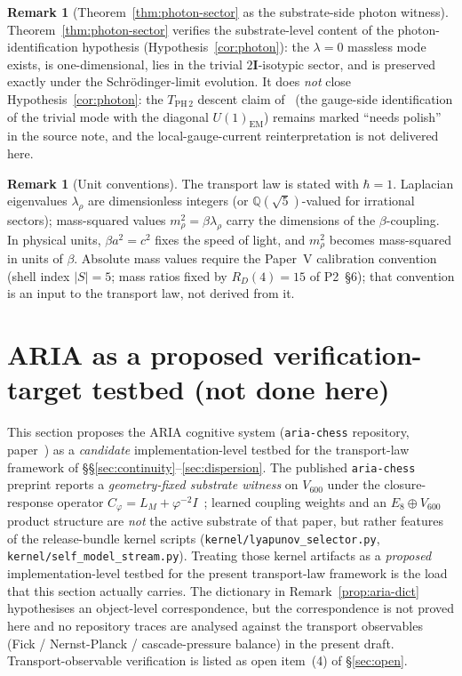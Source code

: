 \documentclass[11pt]{article}
\theoremstyle{definition}
\newtheorem{remark}[theorem]{Remark}
\newcommand{\Q}{\mathbb{Q}}
\newcommand{\twoI}{2\mathbf{I}}
\begin{document}
\begin{remark}[Theorem~\ref{thm:photon-sector} as the substrate-side photon witness]\label{rem:photon-sector-status}
Theorem~\ref{thm:photon-sector} verifies the substrate-level content of the photon-identification hypothesis (Hypothesis~\ref{cor:photon}): the $\lambda = 0$ massless mode exists, is one-dimensional, lies in the trivial $\twoI$-isotypic sector, and is preserved exactly under the Schr\"{o}dinger-limit evolution. It does \emph{not} close Hypothesis~\ref{cor:photon}: the $T_{\text{PH}\,2}$ descent claim of~\citep{CascadeAlphaChain} (the gauge-side identification of the trivial mode with the diagonal $U(1)_{\text{EM}}$) remains marked ``needs polish'' in the source note, and the local-gauge-current reinterpretation is not delivered here.
\end{remark}

\begin{remark}[Unit conventions]\label{rem:units}
The transport law is stated with $\hbar = 1$. Laplacian eigenvalues $\lambda_\rho$ are dimensionless integers (or $\Q(\sqrt 5)$-valued for irrational sectors); mass-squared values $m_\rho^2 = \beta \lambda_\rho$ carry the dimensions of the $\beta$-coupling. In physical units, $\beta a^2 = c^2$ fixes the speed of light, and $m_\rho^2$ becomes mass-squared in units of $\beta$. Absolute mass values require the Paper~V calibration convention (shell index $|S| = 5$; mass ratios fixed by $R_D(4) = 15$ of P2~\S 6); that convention is an input to the transport law, not derived from it.
\end{remark}

\section{ARIA as a proposed verification-target testbed (not done here)}\label{sec:aria}

This section proposes the ARIA cognitive system (\texttt{aria-chess} repository, paper~\citep{SmartARIAChess2026}) as a \emph{candidate} implementation-level testbed for the transport-law framework of \S\S\ref{sec:continuity}--\ref{sec:dispersion}. The published \texttt{aria-chess} preprint reports a \emph{geometry-fixed substrate witness} on $V_{600}$ under the closure-response operator $C_\varphi = L_M + \varphi^{-2}I$~\citep{SmartARIAClosureKernel2026}; learned coupling weights and an $E_8 \oplus V_{600}$ product structure are \emph{not} the active substrate of that paper, but rather features of the release-bundle kernel scripts (\texttt{kernel/lyapunov\_selector.py}, \texttt{kernel/self\_model\_stream.py}). Treating those kernel artifacts as a \emph{proposed} implementation-level testbed for the present transport-law framework is the load that this section actually carries. The dictionary in Remark~\ref{prop:aria-dict} hypothesises an object-level correspondence, but the correspondence is not proved here and no repository traces are analysed against the transport observables (Fick / Nernst-Planck / cascade-pressure balance) in the present draft. Transport-observable verification is listed as open item~(4) of \S\ref{sec:open}.
\end{document}
